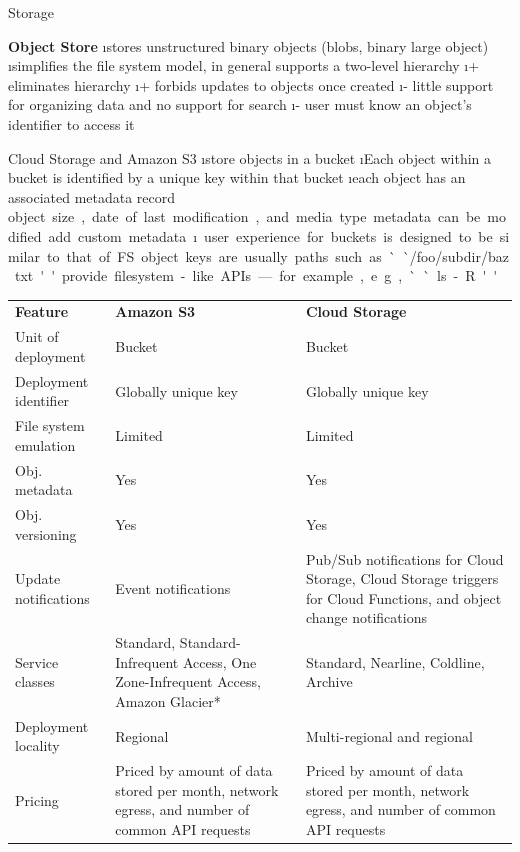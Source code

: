 \begin{frame}[allowframebreaks]{Storage}
\framebreak

\textbf{Object Store}
\i stores unstructured binary objects (blobs, binary large object)
\i simplifies the file system model, in general supports a two-level hierarchy
\i + eliminates hierarchy 
\i + forbids updates to objects once created
\i - little support for organizing data and no support for search
\i - user must know an object's identifier to access it

\framebreak
Cloud Storage and Amazon S3
\i store objects in a bucket
\i Each object within a bucket is identified by a unique key within that bucket
\i each object has an associated metadata record
\si object size, date of last modification, and media type
\si metadata can be modified
\si add custom metadata
\i user experience for buckets is designed to be similar to that of FS
\si object keys are usually paths such as ``/foo/subdir/baz.txt''
\si provide filesystem-like APIs—for example, e.g., ``ls -R''

\framebreak
\begin{table}
  \centering
  \footnotesize
    \begin{tabular}{lp{5cm}p{5cm}}
    \textbf{Feature} & \textbf{Amazon S3} & \textbf{Cloud Storage} \\
    Unit of deployment & Bucket & Bucket \\
    Deployment identifier & Globally unique key & Globally unique key \\
    File system emulation & Limited & Limited \\
    Obj. metadata & Yes   & Yes \\
    Obj. versioning & Yes   & Yes \\
    Update notifications & Event notifications & Pub/Sub notifications for Cloud Storage, Cloud Storage triggers for Cloud Functions, and object change notifications \\
    Service classes & Standard, Standard-Infrequent Access, One Zone-Infrequent Access, Amazon Glacier* & Standard, Nearline, Coldline, Archive \\
    Deployment locality & Regional & Multi-regional and regional \\
    Pricing & Priced by amount of data stored per month, network egress, and number of common API requests & Priced by amount of data stored per month, network egress, and number of common API requests \\
    \end{tabular}%
\end{table}%


\end{frame}
